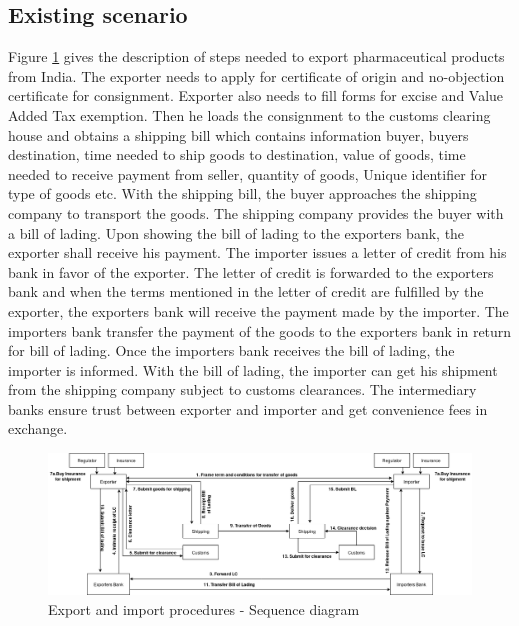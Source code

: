 \documentclass[num-refs]{wiley-article}
\begin{document}
\subsection{Existing scenario}
Figure \ref{diag-casestudy} gives the description of steps needed to export pharmaceutical products from India. The exporter needs to apply for certificate of origin and no-objection certificate for consignment. Exporter also needs to fill forms for excise and Value Added Tax exemption. Then he loads the consignment to the customs clearing house and obtains a shipping bill which contains information buyer, buyers destination, time needed to ship goods to destination, value of goods, time needed to receive payment from seller, quantity of goods, Unique identifier for type of goods etc. With the shipping bill, the buyer approaches the shipping company to transport the goods. The shipping company provides the buyer with a bill of lading. Upon showing the bill of lading to the exporters bank, the exporter shall receive his payment. The importer issues a letter of credit from his bank in favor of the exporter. The letter of credit is forwarded to the exporters bank and when the terms mentioned in the letter of credit are fulfilled by the exporter, the exporters bank will receive the payment made by the importer. The importers bank transfer the payment of the goods to the exporters bank in return for bill of lading. Once the importers bank receives the bill of lading, the importer is informed. With the bill of lading, the importer can get his shipment from the shipping company subject to customs clearances. The intermediary banks ensure trust between exporter and importer and get convenience fees in exchange.

\begin{figure}[!h]
\centering\includegraphics[width=\linewidth]{casestudy.png}
\caption{Export and import procedures - Sequence diagram}
\label{diag-casestudy}
\end{figure}
\end{document}
